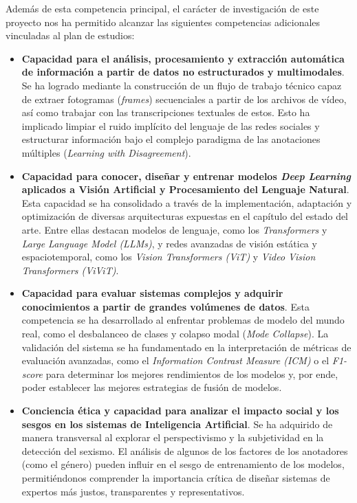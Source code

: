 Además de esta competencia principal, el carácter de investigación de este proyecto nos ha permitido alcanzar las siguientes competencias adicionales vinculadas al plan de estudios: 
\begin{itemize}
    \item \textbf{Capacidad para el análisis, procesamiento y extracción automática de información a partir de datos no estructurados y multimodales}. Se ha logrado mediante la construcción de un flujo de trabajo técnico capaz de extraer fotogramas (\textit{frames}) secuenciales a partir de los archivos de vídeo, así como trabajar con las transcripciones textuales de estos. Esto ha implicado limpiar el ruido implícito del lenguaje de las redes sociales y estructurar información bajo el complejo paradigma de las anotaciones múltiples (\textit{Learning with Disagreement}).
    \item \textbf{Capacidad para conocer, diseñar y entrenar modelos \textit{Deep Learning} aplicados a Visión Artificial y Procesamiento del Lenguaje Natural}. Esta capacidad se ha consolidado a través de la implementación, adaptación y optimización de diversas arquitecturas expuestas en el capítulo del estado del arte. Entre ellas destacan modelos de lenguaje, como los \textit{Transformers} y \textit{Large Language Model (LLMs)}, y redes avanzadas de visión estática y espaciotemporal, como los \textit{Vision Transformers (ViT)} y \textit{Video Vision Transformers (ViViT)}.
    \item \textbf{Capacidad para evaluar sistemas complejos y adquirir conocimientos a partir de grandes volúmenes de datos}. Esta competencia se ha desarrollado al enfrentar problemas de modelo del mundo real, como el desbalanceo de clases y colapso modal (\textit{Mode Collapse}). La validación del sistema se ha fundamentado en la interpretación de métricas de evaluación avanzadas, como el \textit{Information Contrast Measure (ICM)} o el \textit{F1-score} para determinar los mejores rendimientos de los modelos y, por ende, poder establecer las mejores estrategias de fusión de modelos.
    \item \textbf{Conciencia ética y capacidad para analizar el impacto social y los sesgos en los sistemas de Inteligencia Artificial}. Se ha adquirido de manera transversal al explorar el perspectivismo y la subjetividad en la detección del sexismo. El análisis de algunos de los factores de los anotadores (como el género) pueden influir en el sesgo de entrenamiento de los modelos, permitiéndonos comprender la importancia crítica de diseñar sistemas de expertos más justos, transparentes y representativos.    
\end{itemize}

